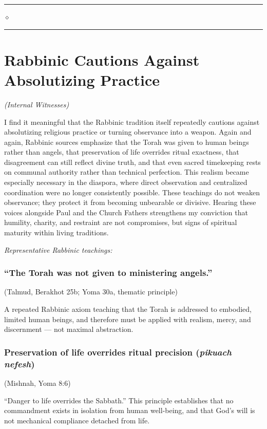 \documentclass[10pt,twoside,openany]{book}
\newcommand{\ornrule}{%
  \par\bigskip
  {\noindent\hfil{\color{gold}\rule[0.5ex]{1.5in}{0.5pt}%
  \quad$\diamond$\quad%
  \rule[0.5ex]{1.5in}{0.5pt}}\hfil\par}%
  \bigskip
}
\begin{document}
\ornrule



\chapter{Rabbinic Cautions Against Absolutizing Practice}
\begin{center}
{\itshape (Internal Witnesses)}
\end{center}

I find it meaningful that the Rabbinic tradition itself repeatedly
cautions against absolutizing religious practice or turning observance
into a weapon. Again and again, Rabbinic sources emphasize that the
Torah was given to human beings rather than angels, that preservation
of life overrides ritual exactness, that disagreement can still reflect
divine truth, and that even sacred timekeeping rests on communal
authority rather than technical perfection. This realism became
especially necessary in the diaspora, where direct observation and
centralized coordination were no longer consistently possible. These
teachings do not weaken observance; they protect it from becoming
unbearable or divisive. Hearing these voices alongside Paul and the
Church Fathers strengthens my conviction that humility, charity, and
restraint are not compromises, but signs of spiritual maturity within
living traditions.

\medskip
\textit{Representative Rabbinic teachings:}

\subsection{``The Torah was not given to ministering angels.''}
{\small (Talmud, Berakhot 25b; Yoma 30a, thematic principle)}

A repeated Rabbinic axiom teaching that the Torah is addressed to
embodied, limited human beings, and therefore must be applied with
realism, mercy, and discernment --- not maximal abstraction.

\subsection{Preservation of life overrides ritual precision (\emph{pikuach nefesh})}
{\small (Mishnah, Yoma 8:6)}

``Danger to life overrides the Sabbath.'' This principle establishes that
no commandment exists in isolation from human well-being, and that
God's will is not mechanical compliance detached from life.
\end{document}
